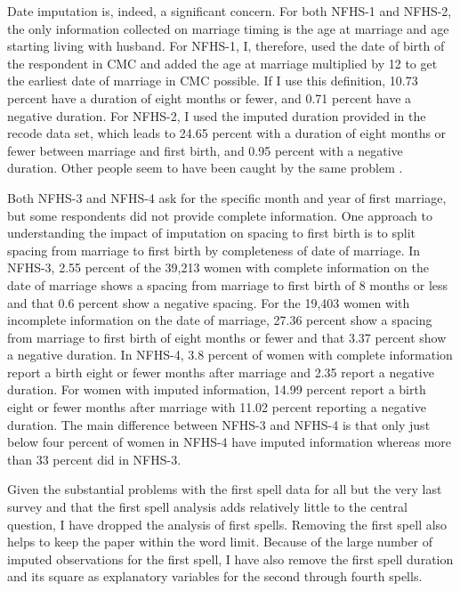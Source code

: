 \documentclass[letterpaper,12pt]{article}
\begin{document}
\begin{enumerate}
[Response:]

Date imputation is, indeed, a significant concern.
For both NFHS-1 and NFHS-2, the only information collected on marriage timing is the age 
at marriage and age starting living with husband.
For NFHS-1, I, therefore, used the date of birth of the respondent in CMC and added the 
age at marriage multiplied by 12 to get the earliest date of marriage in CMC possible.
If I use this definition, 10.73 percent have a duration of eight months or fewer, 
and 0.71 percent have a negative duration.
For NFHS-2, I used the imputed duration provided in the recode data set, which leads to 
24.65 percent with a duration of eight months or fewer between marriage and first birth, 
and 0.95 percent with a negative duration.
Other people seem to have been caught by the same problem 
\citep[See, for example, ][]{Padmadas2004}.

Both NFHS-3 and NFHS-4 ask for the specific month and year of first marriage, but some
respondents did not provide complete information.
One approach to understanding the impact of imputation on spacing to first birth is to 
split spacing from marriage to first birth by completeness of date of marriage.
In NFHS-3, 2.55 percent of the 39,213 women with complete information on the date of 
marriage shows a spacing from marriage to first birth of 8 months or less and that 0.6 
percent show a negative spacing. 
For the 19,403 women with incomplete information on the date of marriage, 27.36 percent show
a spacing from marriage to first birth of eight months or fewer and that 3.37 percent show a 
negative duration.
In NFHS-4, 3.8 percent of women with complete information report a birth eight or fewer months
after marriage and 2.35 report a negative duration.
For women with imputed information, 14.99 percent report a birth eight or fewer months
after marriage with 11.02 percent reporting a negative duration.
The main difference between NFHS-3 and NFHS-4 is that only just below four percent of 
women in NFHS-4 have imputed information whereas more than 33 percent did in NFHS-3.

Given the substantial problems with the first spell data for all but the very last
survey and that the first spell analysis adds relatively little to the central question, 
I have dropped the analysis of first spells.
Removing the first spell also helps to keep the paper within the word limit.
Because of the large number of imputed observations for the first spell, I have also
remove the first spell duration and its square as explanatory variables for the second
through fourth spells.




\end{enumerate}
\end{document}
